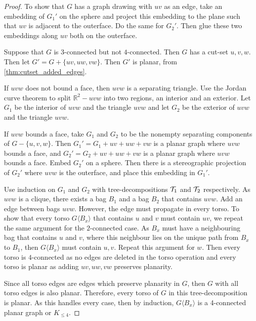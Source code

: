\begin{proof}
	To show that $G$ has a graph drawing with $uv$ as an edge, take an embedding of $G_1'$ on the sphere and project this embedding to the plane such that $uv$ is adjacent to the outerface. Do the same for $G_2'$. Then glue these two embeddings along $uv$ both on the outerface. 

	Suppose that $G$ is $3$-connected but not $4$-connected. Then $G$ has a cut-set $u,v,w$. Then let $G' = G + \{uv, uw, vw\}$. Then $G'$ is planar, from \cref{thm:cutset_added_edges}. 
	
	If $uvw$ does not bound a face, then $uvw$ is a separating triangle. Use the Jordan curve theorem to split $\mathbb{R}^2 - uvw$ into two regions, an interior and an exterior. Let $G_1$ be the interior of $uvw$ and the triangle $uvw$ and let $G_2$ be the exterior of $uvw$ and the triangle $uvw$. 

	If $uvw$ bounds a face, take $G_1$ and $G_2$ to be the nonempty separating components of $G - \{u,v,w\}$. Then $G_1' = G_1 + uv + uw + vw$ is a planar graph where $uvw$ bounds a face, and $G_2' = G_2 + uv + uw + vw$ is a planar graph where $uvw$ bounds a face. Embed $G_2'$ on a sphere. Then there is a stereographic projection of $G_2'$ where $uvw$ is the outerface, and place this embedding in $G_1'$. 

	Use induction on $G_1$ and $G_2$ with tree-decompositions $\mathcal{T}_1$ and $\mathcal{T}_2$ respectively. As $uvw$ is a clique, there exists a bag $B_1$ and a bag $B_2$ that contains $uvw$. Add an edge between bags $uvw$. However, the edge must propagate in every torso. To show that every torso $G\langle B_x \rangle$ that contains $u$ and $v$ must contain $uv$, we repeat the same argument for the $2$-connected case. As $B_x$ must have a neighbouring bag that contains $u$ and $v$, where this neighbour lies on the unique path from $B_x$ to $B_1$, then $G\langle B_x \rangle$ must contain $u, v$. Repeat this argument for $w$. Then every torso is $4$-connected as no edges are deleted in the torso operation and every torso is planar as adding $uv, uw, vw$ preserves planarity. 

	Since all torso edges are edges which preserve planarity in $G$, then $G$ with all torso edges is also planar. Therefore, every torso of $G$ in this tree-decomposition is planar.
	As this handles every case, then by induction, $G \langle B_x \rangle$ is a 4-connected planar graph or $K_{\leq 4}$. 
\end{proof}